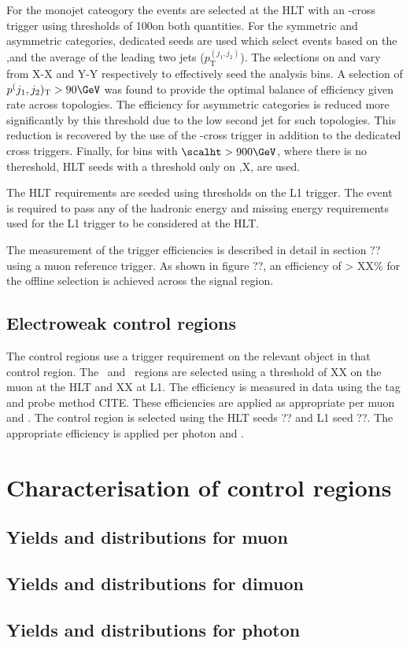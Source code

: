 For the monojet cateogory the events are selected at the HLT with an
\mht-\met cross trigger using thresholds of 100\GeV on both quantities. For the symmetric and asymmetric
categories, dedicated seeds are used which select events based on the \alphat,\scalht and the 
average \pt of the leading two jets ($p^(j_1,j_2)_{\text{T}}$). The selections on \alphat and \scalht
vary from X-X and Y-Y respectively to effectively seed the analysis bins.
A selection of $p^(j_1,j_2)_{\text{T}} > 90\GeV$ was found to provide the optimal 
balance of efficiency given rate across topologies. The efficiency for asymmetric categories is reduced
more significantly by this threshold due to the low second jet \pt for such topologies.
This reduction is recovered by the use of the \mht-\met cross trigger in addition to the dedicated cross triggers.
Finally, for bins with $\scalht > 900 \GeV$, where there is no \alphat thereshold, 
HLT seeds with a threshold only on \scalht,X, are used.

The HLT requirements are seeded using thresholds on the L1 trigger. The event is required
to pass any of the hadronic energy and missing energy requirements used for the L1 
trigger to be considered at the HLT.

The measurement of the trigger efficiencies is described in detail in section ?? using a muon reference trigger. 
As shown in figure ??, an efficiency of > XX\% for the offline selection is achieved across the signal region.

\subsection{Electroweak control regions}

The control regions use a trigger requirement on the relevant object in that control region.
The \mj~and \mmj~regions are selected using a threshold of XX on the muon at the HLT and XX at L1. 
The efficiency is measured in data using the tag and probe method CITE. These efficiencies are applied as appropriate 
per muon \pt and \eta. The \gj control region is selected using the HLT seeds ?? and L1 seed ??. The
appropriate efficiency is applied per photon \pt and \eta.
\section{Characterisation of control regions}
\label{sec:char}
\subsection{Yields and distributions for muon}
\subsection{Yields and distributions for dimuon}
\subsection{Yields and distributions for photon}
